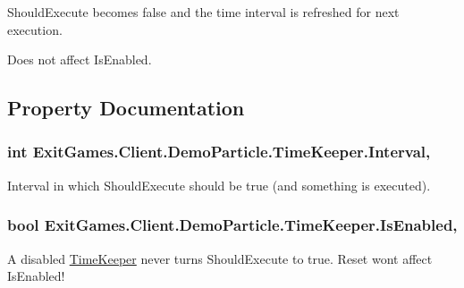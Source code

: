 Should\+Execute becomes false and the time interval is refreshed for next execution. 

Does not affect Is\+Enabled.

\subsection{Property Documentation}
\subsubsection[{\texorpdfstring{Interval}{Interval}}]{\setlength{\rightskip}{0pt plus 5cm}int Exit\+Games.\+Client.\+Demo\+Particle.\+Time\+Keeper.\+Interval\hspace{0.3cm}{\ttfamily [get]}, {\ttfamily [set]}}\hypertarget{class_exit_games_1_1_client_1_1_demo_particle_1_1_time_keeper_af643245f13169287f51e2df2f5b18758}{}\label{class_exit_games_1_1_client_1_1_demo_particle_1_1_time_keeper_af643245f13169287f51e2df2f5b18758}


Interval in which Should\+Execute should be true (and something is executed).

\subsubsection[{\texorpdfstring{Is\+Enabled}{IsEnabled}}]{\setlength{\rightskip}{0pt plus 5cm}bool Exit\+Games.\+Client.\+Demo\+Particle.\+Time\+Keeper.\+Is\+Enabled\hspace{0.3cm}{\ttfamily [get]}, {\ttfamily [set]}}\hypertarget{class_exit_games_1_1_client_1_1_demo_particle_1_1_time_keeper_ad1d37a796623b211b4b98867bb3ac5bf}{}\label{class_exit_games_1_1_client_1_1_demo_particle_1_1_time_keeper_ad1d37a796623b211b4b98867bb3ac5bf}


A disabled \hyperlink{class_exit_games_1_1_client_1_1_demo_particle_1_1_time_keeper}{Time\+Keeper} never turns Should\+Execute to true. Reset won\textquotesingle{}t affect Is\+Enabled!

